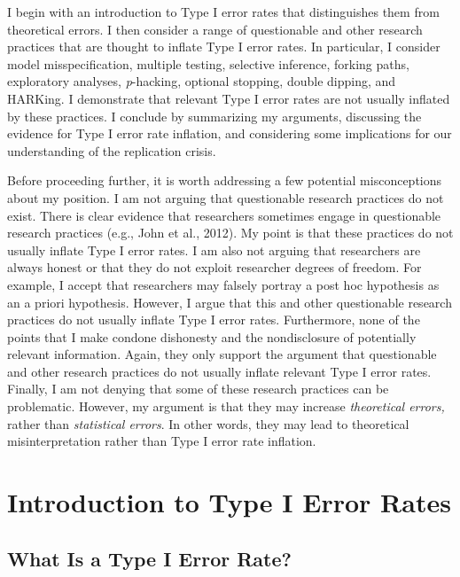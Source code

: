 \documentclass[authordate, empirical]{jote-new-article}
\begin{document}
	I begin with an introduction to Type I error rates that distinguishes them from theoretical errors. I then consider a range of questionable and other research practices that are thought to inflate Type I error rates. In particular, I consider model misspecification, multiple testing, selective inference, forking paths, exploratory analyses,\emph{ p}-hacking, optional stopping, double dipping, and HARKing. I demonstrate that relevant Type I error rates are not usually inflated by these practices. I conclude by summarizing my arguments, discussing the evidence for Type I error rate inflation, and considering some implications for our understanding of the replication crisis.



	Before proceeding further, it is worth addressing a few potential misconceptions about my position. I am not arguing that questionable research practices do not exist. There is clear evidence that researchers sometimes engage in questionable research practices (e.g., John et al., 2012). My point is that these practices do not usually inflate Type I error rates. I am also not arguing that researchers are always honest or that they do not exploit researcher degrees of freedom. For example, I accept that researchers may falsely portray a post hoc hypothesis as an a priori hypothesis. However, I argue that this and other questionable research practices do not usually inflate Type I error rates. Furthermore, none of the points that I make condone dishonesty and the nondisclosure of potentially relevant information. Again, they only support the argument that questionable and other research practices do not usually inflate relevant Type I error rates. Finally, I am not denying that some of these research practices can be problematic. However, my argument is that they may increase\emph{ theoretical errors,} rather than \emph{statistical errors}. In other words, they may lead to theoretical misinterpretation rather than Type I error rate inflation.







	\section{Introduction to Type I Error Rates}



	\subsection{What Is a Type I Error Rate?}
\end{document}
